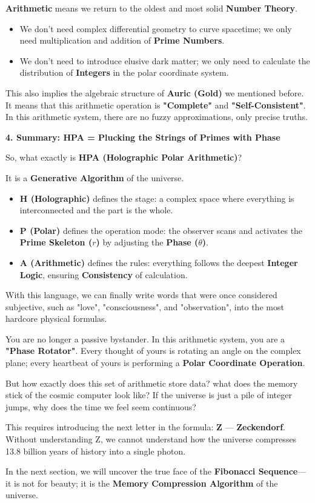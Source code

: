 \textbf{Arithmetic} means we return to the oldest and most solid \textbf{Number Theory}.

\begin{itemize}
\item We don't need complex differential geometry to curve spacetime; we only need multiplication and addition of \textbf{Prime Numbers}.
\item We don't need to introduce elusive dark matter; we only need to calculate the distribution of \textbf{Integers} in the polar coordinate system.
\end{itemize}

This also implies the algebraic structure of \textbf{Auric (Gold)} we mentioned before. It means that this arithmetic operation is \textbf{"Complete"} and \textbf{"Self-Consistent"}. In this arithmetic system, there are no fuzzy approximations, only precise truths.

\textbf{4. Summary: HPA = Plucking the Strings of Primes with Phase}

So, what exactly is \textbf{HPA (Holographic Polar Arithmetic)}?

It is a \textbf{Generative Algorithm} of the universe.

\begin{itemize}
\item \textbf{H (Holographic)} defines the stage: a complex space where everything is interconnected and the part is the whole.
\item \textbf{P (Polar)} defines the operation mode: the observer scans and activates the \textbf{Prime Skeleton ($r$)} by adjusting the \textbf{Phase ($\theta$)}.
\item \textbf{A (Arithmetic)} defines the rules: everything follows the deepest \textbf{Integer Logic}, ensuring \textbf{Consistency} of calculation.
\end{itemize}

With this language, we can finally write words that were once considered subjective, such as "love", "consciousness", and "observation", into the most hardcore physical formulas.

You are no longer a passive bystander. In this arithmetic system, you are a \textbf{"Phase Rotator"}. Every thought of yours is rotating an angle on the complex plane; every heartbeat of yours is performing a \textbf{Polar Coordinate Operation}.

But how exactly does this set of arithmetic store data? what does the memory stick of the cosmic computer look like? If the universe is just a pile of integer jumps, why does the time we feel seem continuous?

This requires introducing the next letter in the formula: \textbf{Z} — \textbf{Zeckendorf}. Without understanding Z, we cannot understand how the universe compresses 13.8 billion years of history into a single photon.

In the next section, we will uncover the true face of the \textbf{Fibonacci Sequence}—it is not for beauty; it is the \textbf{Memory Compression Algorithm} of the universe.

